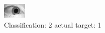 \begin{figure}[h!]
\begin{center}
\includegraphics[width=0.60\columnwidth]{figures/ID1526_class_2_target_1.png}
\end{center}
\caption{ Classification: 2 actual target: 1}
\label{fig:ID1526_class_2_target_1}
\end{figure}
